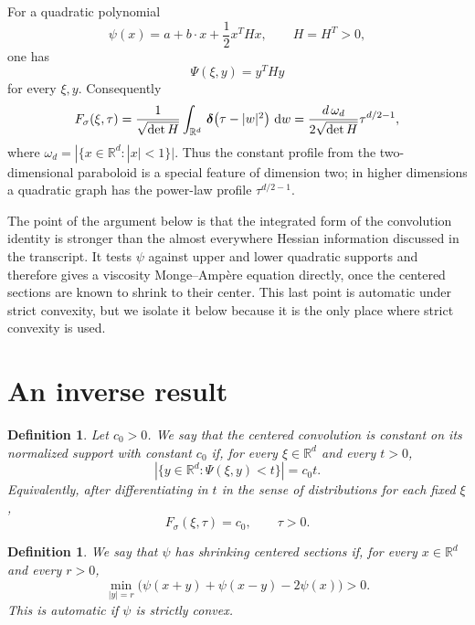 \documentclass[11pt]{amsart}
\newcommand{\pvector}[1]{
  \begin{pmatrix}
    #1
  \end{pmatrix}}
\newcommand{\ddirac}[1]{
  \,\boldsymbol{\delta}\!\pvector{#1}\!}
\renewcommand{\d}{\,{\rm d}}
\def\R{\mathbb{R}}
\newtheorem{definition}[theorem]{Definition}
\begin{document}
For a quadratic polynomial
\[
    \psi(x)=a+b\cdot x+\frac12 x^T Hx,\qquad H=H^T>0,
\]
one has
\[
    \Psi(\xi,y)=y^THy
\]
for every $\xi,y$.  Consequently
\[
    F_\sigma(\xi,\tau)
    =\frac1{\sqrt{\det H}}\int_{\R^d}\ddirac{\tau-|w|^2}\,\d w
    =\frac{d\,\omega_d}{2\sqrt{\det H}}\tau^{d/2-1},
\]
where $\omega_d=|\{x\in\R^d:|x|<1\}|$.  Thus the constant profile from the
two-dimensional paraboloid is a special feature of dimension two; in higher
dimensions a quadratic graph has the power-law profile $\tau^{d/2-1}$.

The point of the argument below is that the integrated form of the convolution
identity is stronger than the almost everywhere Hessian information discussed
in the transcript.  It tests $\psi$ against upper and lower quadratic supports
and therefore gives a viscosity Monge--Ampère equation directly, once the
centered sections are known to shrink to their center.  This last point is
automatic under strict convexity, but we isolate it below because it is the only
place where strict convexity is used.

\section{An inverse result}

\begin{definition}\label{def:constant-normalized}
Let $c_0>0$.  We say that the centered convolution is constant on its
normalized support with constant $c_0$ if, for every $\xi\in\R^d$ and every
$t>0$,
\begin{equation}\label{eq:section-law}
    |\{y\in\R^d:\Psi(\xi,y)<t\}|
    =c_0t.
\end{equation}
Equivalently, after differentiating in $t$ in the sense of distributions for
each fixed $\xi$,
\begin{equation}\label{eq:profile}
    F_\sigma(\xi,\tau)=c_0,\qquad \tau>0.
\end{equation}
\end{definition}

\begin{definition}\label{def:shrinking}
We say that $\psi$ has shrinking centered sections if, for every $x\in\R^d$
and every $r>0$,
\[
    \min_{|y|=r}\bigl(\psi(x+y)+\psi(x-y)-2\psi(x)\bigr)>0.
\]
This is automatic if $\psi$ is strictly convex.
\end{definition}
\end{document}
